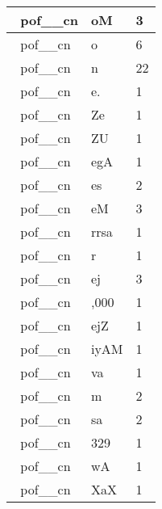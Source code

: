 \documentclass[a4 paper]{article}
\begin{document}
\begin{longtable}{cp{}p{}}
\ \midrule pof\_\_cn & oM & 3\\ \midrule pof\_\_cn & o & 6\\ \midrule pof\_\_cn & n & 22\\ \midrule pof\_\_cn & e. & 1\\ \midrule pof\_\_cn & Ze & 1\\ \midrule pof\_\_cn & ZU & 1\\ \midrule pof\_\_cn & egA & 1\\ \midrule pof\_\_cn & es & 2\\ \midrule pof\_\_cn & eM & 3\\ \midrule pof\_\_cn & rrsa & 1\\ \midrule pof\_\_cn & r & 1\\ \midrule pof\_\_cn & ej & 3\\ \midrule pof\_\_cn & ,000 & 1\\ \midrule pof\_\_cn & ejZ & 1\\ \midrule pof\_\_cn & iyAM & 1\\ \midrule pof\_\_cn & va & 1\\ \midrule pof\_\_cn & m & 2\\ \midrule pof\_\_cn & sa & 2\\ \midrule pof\_\_cn & 329 & 1\\ \midrule pof\_\_cn & wA & 1\\ \midrule pof\_\_cn & XaX & 1\\ \midrule 

\end{longtable}
\end{document}
